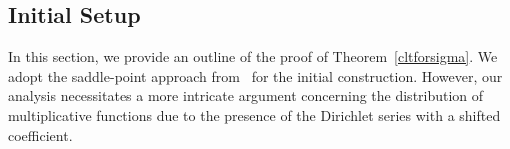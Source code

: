 \documentclass[12pt, oneside,reqno]{amsart}
\numberwithin{equation}{section}
\newtheorem{theorem}{Theorem}[section]
\begin{document}

\subsection{Initial Setup}\label{initialsetup}

In this section, we provide an outline of the proof of Theorem~\ref{cltforsigma}. We adopt the saddle-point approach from~\cite[\S3]{lipniketal} for the initial construction. However, our analysis necessitates a more intricate argument concerning the distribution of multiplicative functions due to the presence of the Dirichlet series with a shifted coefficient. 
\end{document}
